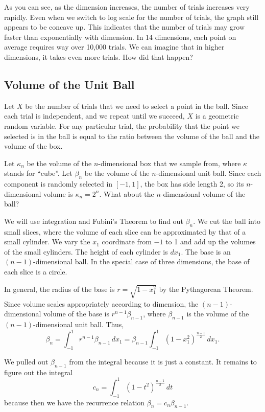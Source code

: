 \documentclass{article}
\begin{document}
As you can see, as the dimension increases, the number of trials increases very rapidly. Even when we switch to log scale for the number of trials, the graph still appears to be concave up. This indicates that the number of trials may grow faster than exponentially with dimension. In 14 dimensions, each point on average requires way over 10,000 trials. We can imagine that in higher dimensions, it takes even more trials. How did that happen?

\subsection{Volume of the Unit Ball}

Let $X$ be the number of trials that we need to select a point in the ball. Since each trial is independent, and we repeat until we succeed, $X$ is a geometric random variable. For any particular trial, the probability that the point we selected is in the ball is equal to the ratio between the volume of the ball and the volume of the box.

Let $\kappa_n$ be the volume of the $n$-dimensional box that we sample from, where $\kappa$ stands for ``cube''. Let $\beta_n$ be the volume of the $n$-dimensional unit ball. Since each component is randomly selected in $[-1, 1]$, the box has side length 2, so its $n$-dimensional volume is $\kappa_n = 2^n$. What about the $n$-dimensional volume of the ball?


We will use integration and Fubini's Theorem to find out $\beta_n$. We cut the ball into small slices, where the volume of each slice can be approximated by that of a small cylinder. We vary the $x_1$ coordinate from $-1$ to 1 and add up the volumes of the small cylinders. The height of each cylinder is $dx_1$. The base is an $(n-1)$-dimensional ball. In the special case of three dimensions, the base of each slice is a circle.

In general, the radius of the base is $r = \sqrt{1 - x_1^2}$ by the Pythagorean Theorem. Since volume scales appropriately according to dimension, the $(n-1)$-dimensional volume of the base is $r^{n-1} \beta_{n-1}$, where $\beta_{n-1}$ is the volume of the $(n-1)$-dimensional unit ball. Thus,
\[
    \beta_n = \int_{-1}^1 r^{n-1} \beta_{n-1} \, dx_1 = \beta_{n-1} \int_{-1}^1 (1 - x_1^2)^{\frac{n-1}{2}} \, dx_1.
\]

We pulled out $\beta_{n-1}$ from the integral because it is just a constant. It remains to figure out the integral
\[
    c_n = \int_{-1}^1 (1 - t^2)^{\frac{n-1}{2}} \, dt
\]
because then we have the recurrence relation $\beta_n = c_n \beta_{n - 1}$.
\end{document}
